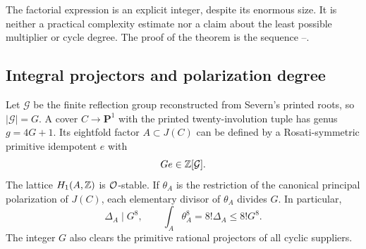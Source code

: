 The factorial expression is an explicit integer, despite its enormous size. It is neither a practical complexity estimate nor a claim about the least possible multiplier or cycle degree. The proof of the theorem is the sequence --.

\subsection{Integral projectors and polarization degree}

\begin{proposition}\label{SQ2}
Let $\mathcal G$ be the finite reflection group reconstructed from Severn's printed roots, so $|\mathcal G|=G$. A cover $C\to\mathbf P^1$ with the printed twenty-involution tuple has genus $g=4G+1$. Its eightfold factor $A\subset J(C)$ can be defined by a Rosati-symmetric primitive idempotent $e$ with
\[
 Ge\in\mathbb Z[\mathcal G].
\]
The lattice $H_1(A,\mathbb Z)$ is $\mathcal O$-stable. If $\theta_A$ is the restriction of the canonical principal polarization of $J(C)$, each elementary divisor of $\theta_A$ divides $G$. In particular,
\begin{equation}\label{eq:SQ-sourcepolarization}
 \Delta_A\mid G^8,\qquad \int_A\theta_A^8=8!\Delta_A\le8!G^8.
\end{equation}
The integer $G$ also clears the primitive rational projectors of all cyclic suppliers.
\end{proposition}
